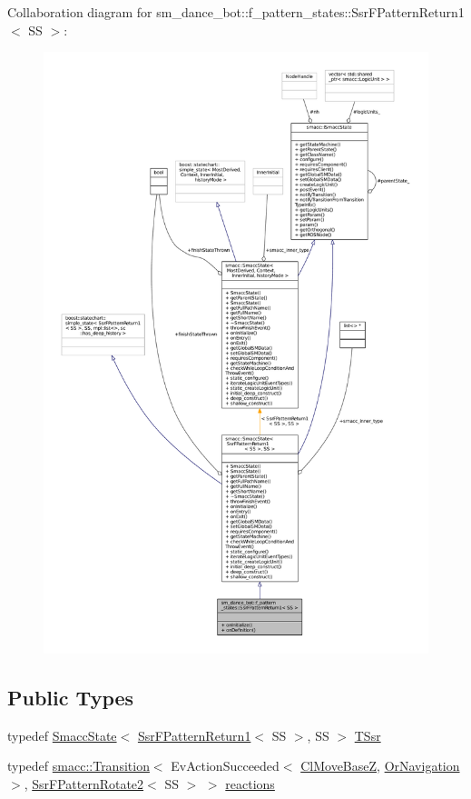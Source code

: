 Collaboration diagram for sm\+\_\+dance\+\_\+bot\+:\+:f\+\_\+pattern\+\_\+states\+:\+:Ssr\+F\+Pattern\+Return1$<$ SS $>$\+:
\nopagebreak
\begin{figure}[H]
\begin{center}
\leavevmode
\includegraphics[width=350pt]{structsm__dance__bot_1_1f__pattern__states_1_1SsrFPatternReturn1__coll__graph}
\end{center}
\end{figure}
\subsection*{Public Types}
\begin{DoxyCompactItemize}
\item 
typedef \hyperlink{classSmaccState}{Smacc\+State}$<$ \hyperlink{structsm__dance__bot_1_1f__pattern__states_1_1SsrFPatternReturn1}{Ssr\+F\+Pattern\+Return1}$<$ SS $>$, SS $>$ \hyperlink{structsm__dance__bot_1_1f__pattern__states_1_1SsrFPatternReturn1_a211ff69eaf4c8969acb0699efa0bd51a}{T\+Ssr}
\item 
typedef \hyperlink{classsmacc_1_1Transition}{smacc\+::\+Transition}$<$ Ev\+Action\+Succeeded$<$ \hyperlink{classmove__base__z__client_1_1ClMoveBaseZ}{Cl\+Move\+BaseZ}, \hyperlink{classsm__dance__bot_1_1OrNavigation}{Or\+Navigation} $>$, \hyperlink{structsm__dance__bot_1_1f__pattern__states_1_1SsrFPatternRotate2}{Ssr\+F\+Pattern\+Rotate2}$<$ SS $>$ $>$ \hyperlink{structsm__dance__bot_1_1f__pattern__states_1_1SsrFPatternReturn1_aa5df2d3dbbe99de666b7e1a8429e71bd}{reactions}
\end{DoxyCompactItemize}
